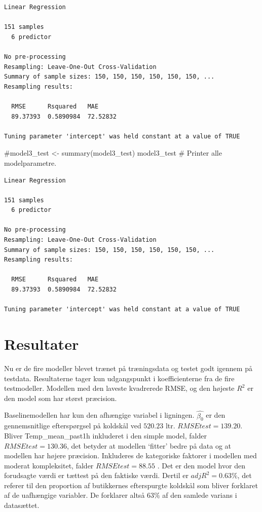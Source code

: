 \documentclass[
  12pt,
  a4paper,
  DIV=11,
  numbers=noendperiod]{scrartcl}
\newenvironment{Shaded}{\begin{snugshade}}{\end{snugshade}}
\newcommand{\CommentTok}[1]{\textcolor[rgb]{0.37,0.37,0.37}{#1}}
\newcommand{\NormalTok}[1]{\textcolor[rgb]{0.00,0.23,0.31}{#1}}
\begin{document}
\begin{verbatim}
Linear Regression 

151 samples
  6 predictor

No pre-processing
Resampling: Leave-One-Out Cross-Validation 
Summary of sample sizes: 150, 150, 150, 150, 150, 150, ... 
Resampling results:

  RMSE      Rsquared   MAE     
  89.37393  0.5890984  72.52832

Tuning parameter 'intercept' was held constant at a value of TRUE
\end{verbatim}

\begin{Shaded}
\begin{Highlighting}[numbers=left,,]
\CommentTok{\#model3\_test \textless{}{-} summary(model3\_test)}
\NormalTok{model3\_test }\CommentTok{\# Printer alle modelparametre.}
\end{Highlighting}
\end{Shaded}

\begin{verbatim}
Linear Regression 

151 samples
  6 predictor

No pre-processing
Resampling: Leave-One-Out Cross-Validation 
Summary of sample sizes: 150, 150, 150, 150, 150, 150, ... 
Resampling results:

  RMSE      Rsquared   MAE     
  89.37393  0.5890984  72.52832

Tuning parameter 'intercept' was held constant at a value of TRUE
\end{verbatim}

\hypertarget{resultater}{%
\section{Resultater}\label{resultater}}

Nu er de fire modeller blevet trænet på træningsdata og testet godt
igennem på testdata. Resultaterne tager kun udgangspunkt i
koefficienterne fra de fire testmodeller. Modellen med den laveste
kvadrerede RMSE, og den højeste \(R^2\) er den model som har størst
præcision.

Baselinemodellen har kun den afhængige variabel i ligningen.
\(\hat{\beta_0}\) er den gennemsnitlige efterspørgsel på koldskål ved
\(520.23\) ltr. \(RMSEtest=139.20\). Bliver Temp\_mean\_past1h
inkluderet i den simple model, falder \(RMSEtest=130.36\), det betyder
at modellen `fitter' bedre på data og at modellen har højere præcision.
Inkluderes de kategoriske faktorer i modellen med moderat kompleksitet,
falder \(RMSEtest=88.55\) . Det er den model hvor den forudsagte værdi
er tættest på den faktiske værdi. Dertil er \(adjR^2 = 0.63\%\), det
referer til den proportion af butikkernes efterspurgte koldskål som
bliver forklaret af de uafhængige variabler. De forklarer altså 63\% af
den samlede varians i datasættet.
\end{document}
